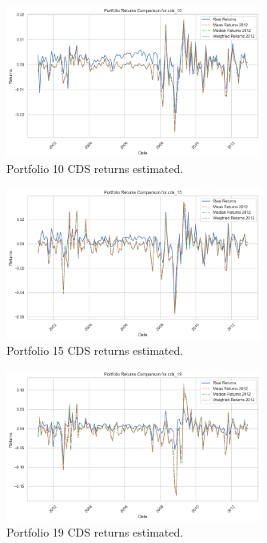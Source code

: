 \documentclass{article}
\begin{document}
\begin{Data science tools for finance final project}
\begin{figure}[H]
    \centering
    \includegraphics[width=0.75\textwidth]{../assets/returns_cds10_insample.png}
    \caption{\label{fig:myplot}Portfolio 10 CDS returns estimated.}
    \end{figure}

\begin{figure}[H]
    \centering
    \includegraphics[width=0.75\textwidth]{../assets/returns_cds15_insample.png}
    \caption{\label{fig:myplot}Portfolio 15 CDS returns estimated.}
    \end{figure}          

\begin{figure}[H]
    \centering
    \includegraphics[width=0.75\textwidth]{../assets/returns_cds19_insample.png}
    \caption{\label{fig:myplot}Portfolio 19 CDS returns estimated.}
    \end{figure}   


\end{Data science tools for finance final project}
\end{document}

